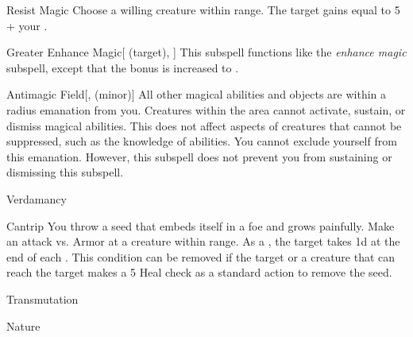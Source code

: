 \begin{ability}[\nth{5}]{Resist Magic}
Choose a willing creature within \rngmed range.
The target gains  equal to 5 + your .
\end{ability}
\vspace{0.25em}



\begin{ability}[\nth{6}]{Greater Enhance Magic}[ (target), ]
This subspell functions like the \textit{enhance magic} subspell, except that the bonus is increased to .
\end{ability}
\vspace{0.25em}



\begin{ability}[\nth{7}]{Antimagic Field}[,  (minor)]
All other magical abilities and objects are  within a \areamed radius emanation from you.
Creatures within the area cannot activate, sustain, or dismiss magical abilities.
This does not affect aspects of creatures that cannot be suppressed, such as the knowledge of abilities.
You cannot exclude yourself from this emanation.
However, this subspell does not prevent you from sustaining or dismissing this subspell.
\end{ability}
\vspace{0.25em}


\newpage
\begin{spellsection}{Verdamancy}

\begin{spellheader}
\end{spellheader}


\begin{ability}{Cantrip}
You throw a seed that embeds itself in a foe and grows painfully.
Make an attack vs. Armor at a creature within \rngclose range.
\hit As a , the target takes  \minus1d at the end of each .
This condition can be removed if the target or a creature that can reach the target makes a  5 Heal check as a standard action to remove the seed.
\end{ability}




 Transmutation

 Nature
\end{spellsection}


